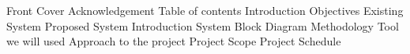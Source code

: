 Front Cover 
Acknowledgement 
Table of contents 
Introduction 
Objectives 
Existing System 
Proposed System
Introduction 
System Block Diagram 
Methodology
Tool we will used 
Approach to the project 
Project Scope 
Project Schedule 